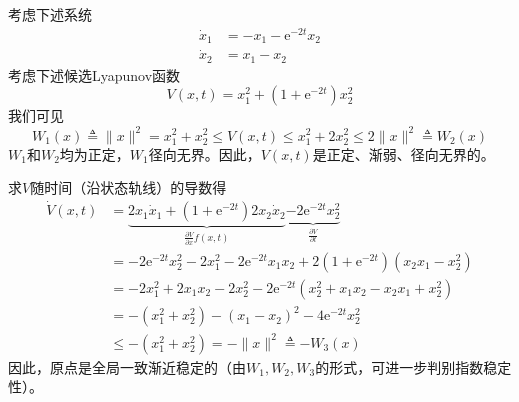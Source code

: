 \begin{example}
  考虑下述系统
  \begin{align*}
    \dot{x}_1 & = - x_1 - \mathrm{e}^{- 2 t} x_2\\
    \dot{x}_2 & = x_1 - x_2
  \end{align*}
  考虑下述候选Lyapunov函数
  \[ V (x, t) = x^2_1 + (1 + \mathrm{e}^{- 2 t}) x^2_2 \]
  我们可见
  \[ W_1 (x)\triangleq \| x \|^2 = x^2_1 + x^2_2 \leq V (x, t) \leq x^2_1 + 2
     x^2_2  \leq 2 \| x \|^2 \triangleq W_2 (x) \]
  $W_1$和$W_2$均为正定，$W_1$径向无界。因此，$V (x, t)$是正定、渐弱、径向无界的。
  
  求$V$随时间（沿状态轨线）的导数得
  \begin{align*}
    \dot{V} (x, t) & =  \underbrace{2 x_1 \dot{ x}_1 + (1 + \mathrm{e}^{- 2 t}) 2 x_2 \dot{x}_2}_{\frac{\partial V}{\partial x} f (x, t)}  \underbrace{-2 \mathrm{e}^{- 2 t} x^2_2}_{\frac{\partial V}{\partial t}}\\
    &=-2\mathrm{e}^{-2t}x_{2}^{2}-2x_{1}^{2}-2\mathrm{e}^{-2t}x_{1}x_{2}+2(1+\mathrm{e}^{-2t})(x_{2}x_{1}-x_{2}^{2})\\
    &=-2x_{1}^{2}+2x_{1}x_{2}-2x_{2}^{2}-2\mathrm{e}^{-2t}(x_{2}^{2}+x_{1}x_{2}-x_{2}x_{1}+x_{2}^{2})\\
    & =  - (x^2_1 + x^2_2) - (x_1 - x_2)^2 - 4 \mathrm{e}^{- 2 t} x^2_2\\
    & \leq  - (x^2_1 + x^2_2) = - \| x \|^2\triangleq  - W_3 (x)
  \end{align*}
  因此，原点是全局一致渐近稳定的（由$W_1,W_2,W_3$的形式，可进一步判别指数稳定性）。
\end{example}